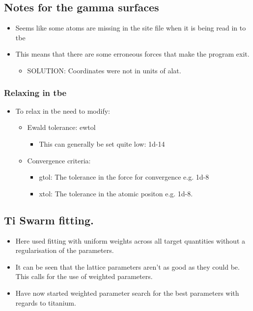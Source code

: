 \documentclass[11pt]{article}
\begin{document}
\subsection{Notes for the gamma surfaces}
\label{sec-2-2}
\begin{itemize}
\item Seems like some atoms are missing in the site file when it is being read
in to tbe
\item This means that there are some erroneous forces that make the program
exit.
\begin{itemize}
\item SOLUTION: Coordinates were not in units of alat.
\end{itemize}
\end{itemize}
\subsubsection{Relaxing in tbe}
\label{sec-2-2-1}
\begin{itemize}
\item To relax in tbe need to modify:
\begin{itemize}
\item Ewald tolerance: ewtol
\begin{itemize}
\item This can generally be set quite low: 1d-14
\end{itemize}
\item Convergence criteria:
\begin{itemize}
\item gtol: The tolerance in the force for convergence e.g. 1d-8
\item xtol: The tolerance in the atomic positon e.g. 1d-8.
\end{itemize}
\end{itemize}
\end{itemize}

\subsection{Ti Swarm fitting.}
\label{sec-2-3}
\begin{itemize}
\item Here used fitting with uniform weights across all target quantities
without a regularisation of the parameters.
\item It can be seen that the lattice parameters aren't as good as they could
be. This calls for the use of weighted parameters.
\item Have now started weighted parameter search for the best parameters with
regards to titanium.
\end{itemize}
\end{document}
